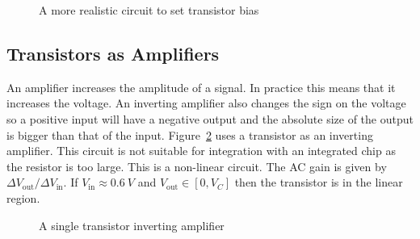 \documentclass{article}
\begin{document}
    \begin{figure}[ht]
        \centering
        \caption{A more realistic circuit to set transistor bias}
        \label{Complicated transistor bias}
    \end{figure}

    \subsection{Transistors as Amplifiers}\label{previous calculation for small signal analysis}
    An amplifier increases the amplitude of a signal. 
    In practice this means that it increases the voltage. 
    An inverting amplifier also changes the sign on the voltage so a positive input will have a negative output and the absolute size of the output is bigger than that of the input. 
    Figure~\ref{single transistor inverting amplifier} uses a transistor as an inverting amplifier. This circuit is not suitable for integration with an integrated chip as the resistor is too large. 
    This is a non-linear circuit. 
    The AC gain is given by \(\Delta V_{\text{out}}/\Delta V_{\text{in}}\). If \(V_{\text{in}}\approx \SI{0.6}{V}\)  and \(V_\text{out}\in [0, V_{C}]\) then the transistor is in the linear region.
    
    \begin{figure}[ht]
        \centering
        \caption{A single transistor inverting amplifier}
        \label{single transistor inverting amplifier}
    \end{figure}
\end{document}
